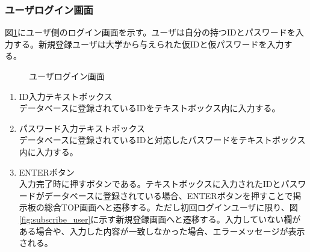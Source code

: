 \documentclass[a4j]{jarticle}
\begin{document}
\subsubsection{ユーザログイン画面}
図\ref{fig:login_user}にユーザ側のログイン画面を示す。ユーザは自分の持つIDとパスワードを入力する。新規登録ユーザは大学から与えられた仮IDと仮パスワードを入力する。
\begin{figure}[H]
\centering
{}
\caption{ユーザログイン画面}
\label{fig:login_user}
\end{figure}
\begin{enumerate}
  \renewcommand{\labelenumi}{\textcircled{\scriptsize \theenumi}}

\item ID入力テキストボックス\\
データベースに登録されているIDをテキストボックス内に入力する。
\item パスワード入力テキストボックス\\
データベースに登録されているIDと対応したパスワードをテキストボックス内に入力する。
\item ENTERボタン\\
入力完了時に押すボタンである。テキストボックスに入力されたIDとパスワードがデータベースに登録されている場合、ENTERボタンを押すことで掲示板の総合TOP画面へと遷移する。ただし初回ログインユーザに限り、図\ref{fig:subscribe_user}に示す新規登録画面へと遷移する。入力していない欄がある場合や、入力した内容が一致しなかった場合、エラーメッセージが表示される。
\end{enumerate}
\end{document}
